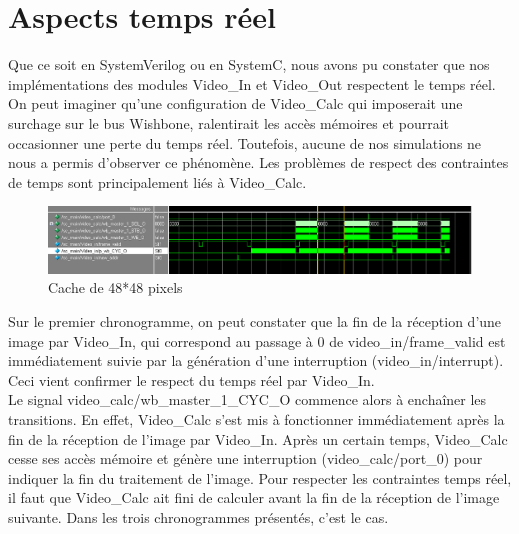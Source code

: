 \documentclass[a4paper,12pt]{report}
\begin{document}
{{{	 }

	 \chapter{Aspects temps réel}
	 {Que ce soit en SystemVerilog ou en SystemC, nous avons pu constater que nos implémentations des modules Video\_In et Video\_Out respectent le temps réel. 
	 On peut imaginer qu'une configuration de Video\_Calc qui imposerait une surchage sur le bus Wishbone, ralentirait les accès mémoires et pourrait occasionner une perte du temps réel. Toutefois, aucune de nos simulations ne nous a permis d'observer ce phénomène.
	 Les problèmes de respect des contraintes de temps sont principalement liés à Video\_Calc.

	\begin{figure}[!h]
		\centering
		\includegraphics[scale = 0.33]{wave_sans_wait_reduced.png}
	\caption{Cache de 48*48 pixels}
	\end{figure}
	
	Sur le premier chronogramme, on peut constater que la fin de la réception d'une image par Video\_In, qui correspond au passage à 0 de video\_in/frame\_valid est immédiatement suivie par la génération d'une interruption (video\_in/interrupt). 
	Ceci vient confirmer le respect du temps réel par Video\_In.\\ 
	Le signal video\_calc/wb\_master\_1\_CYC\_O commence alors à enchaîner les transitions. 
	En effet, Video\_Calc s'est mis à fonctionner immédiatement après la fin de la réception de l'image par Video\_In.
	Après un certain temps, Video\_Calc cesse ses accès mémoire et génère une interruption (video\_calc/port\_0) pour indiquer la fin du traitement de l'image. 
	Pour respecter les contraintes temps réel, il faut que Video\_Calc ait fini de calculer avant la fin de la réception de l'image suivante. Dans les trois chronogrammes présentés, c'est le cas.

}}}
\end{document}

